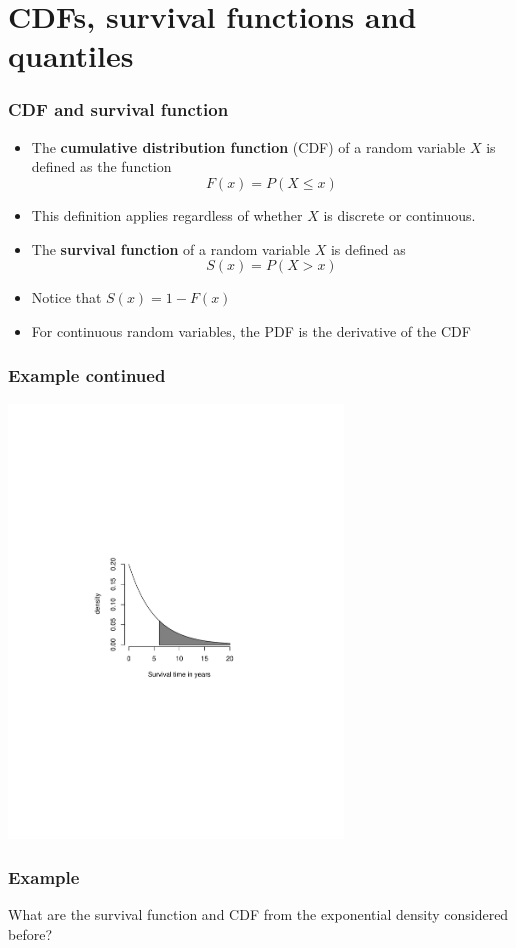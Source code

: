 \documentclass[aspectratio=169]{beamer}
\begin{document}
\section{CDFs, survival functions and quantiles}
\begin{frame}
\frametitle{CDF and survival function}
\begin{itemize}
\item The {\bf cumulative distribution function} (CDF) of a random variable $X$
is defined as the function 
$$
F(x) = P(X \leq x)
$$
\item This definition applies regardless of whether $X$ is discrete or continuous.
\item The {\bf survival function} of a random variable $X$ is defined as
$$
S(x) = P(X > x)
$$
\item Notice that $S(x) = 1 - F(x)$
\item For continuous random variables, the PDF is the derivative of the CDF
\end{itemize}
\end{frame}

\begin{frame}
\frametitle{Example continued}
   \includegraphics[width=3.5in]{exponential.pdf}
\end{frame}

\begin{frame}
\frametitle{Example}
What are the survival function and CDF from the exponential density considered before?
\end{frame}
\end{document}
